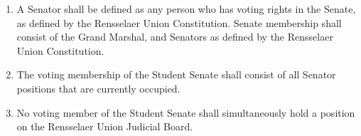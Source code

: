 \begin{enumerate}
\item A Senator shall be defined as any person who has voting rights in the Senate, as defined by the Rensselaer Union Constitution.
Senate membership shall consist of the Grand Marshal, and Senators as defined by the Rensselaer Union Constitution.
\item The voting membership of the Student Senate shall consist of all Senator positions that are currently occupied.
\item No voting member of the Student Senate shall simultaneously hold a position on the Rensselaer Union Judicial Board.
\end{enumerate}